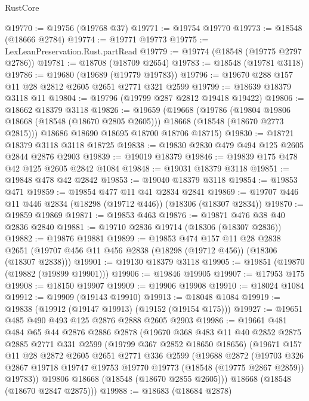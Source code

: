 \begin{lexlean}{RustCore}
\begin{coremodule}
@19770 := @19756 (@19768 @37)
@19771 := @19754 @19770
@19773 := @18548 (@18666 @2784)
@19774 := @19771 @19773
@19775 := LexLeanPreservation.Rust.partRead
@19779 := @19774 (@18548 (@19775 @2797 @2786))
@19781 := @18708 (@18709 @2654)
@19783 := @18548 (@19781 @3118)
@19786 := @19680 (@19689 (@19779 @19783))
@19796 := @19670 @288 @157 @11 @28 @2812 @2605 @2651 @2771 @321 @2599
@19799 := @18639 @18379 @3118 @11
@19804 := @19796 (@19799 @287 @2812 @19418 @19422)
@19806 := @18662 @18379 @3118
@19826 := @19659
    (@19668
      (@19786
        (@19804 @19806 @18668 (@18548 (@18670 @2805 @2605)))
        @18668
        (@18548 (@18670 @2773 @2815)))
      @18686
      @18690
      @18695
      @18700
      @18706
      @18715)
@19830 := @18721 @18379 @3118 @3118 @18725
@19838 := @19830 @2830 @479 @494 @125 @2605 @2844 @2876 @2903
@19839 := @19019 @18379
@19846 := @19839 @175 @478 @42 @125 @2605 @2842 @1084
@19848 := @19031 @18379 @3118
@19851 := @19848 @478 @42 @2842
@19853 := @19040 @18379 @3118
@19854 := @19853 @471
@19859 := @19854 @477 @11 @41 @2834 @2841
@19869 := @19707 @446 @11 @446 @2834 (@18298 (@19712 @446)) (@18306 (@18307 @2834))
@19870 := @19859 @19869
@19871 := @19853 @463
@19876 := @19871 @476 @38 @40 @2836 @2840
@19881 := @19710 @2836 @19714 (@18306 (@18307 @2836))
@19882 := @19876 @19881
@19899 := @19853
    @474
    @157
    @11
    @28
    @2838
    @2651
    (@19707 @456 @11 @456 @2838 (@18298 (@19712 @456)) (@18306 (@18307 @2838)))
@19901 := @19130 @18379 @3118
@19905 := @19851 (@19870 (@19882 (@19899 @19901)))
@19906 := @19846 @19905
@19907 := @17953 @175
@19908 := @18150 @19907
@19909 := @19906 @19908
@19910 := @18024 @1084
@19912 := @19909 (@19143 @19910)
@19913 := @18048 @1084
@19919 := @19838 (@19912 (@19147 @19913) (@19152 (@19154 @175)))
@19927 := @19651 @485 @490 @493 @125 @2876 @2888 @2605 @2903
@19986 := @19661
    @481
    @484
    @65
    @44
    @2876
    @2886
    @2878
    (@19670
      @368
      @483
      @11
      @40
      @2852
      @2875
      @2885
      @2771
      @331
      @2599
      (@19799 @367 @2852 @18650 @18656)
      (@19671
        @157
        @11
        @28
        @2872
        @2605
        @2651
        @2771
        @336
        @2599
        (@19688
          @2872
          (@19703
            @326
            @2867
            @19718
            @19747
            @19753
            @19770
            @19773
            (@18548 (@19775 @2867 @2859))
            @19783))
        @19806
        @18668
        (@18548 (@18670 @2855 @2605)))
      @18668
      (@18548 (@18670 @2847 @2875)))
@19988 := @18683 (@18684 @2878)

\end{coremodule}
\end{lexlean}
